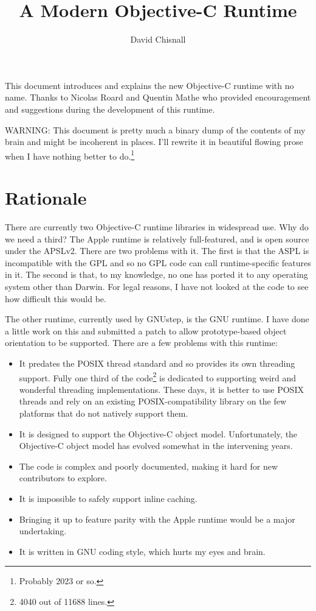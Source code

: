 \documentclass[10pt]{article}
\title{A Modern Objective-C Runtime}
\author{David Chisnall}
\begin{document}
	\maketitle

	This document introduces and explains the new Objective-C runtime with no name.  Thanks to Nicolas Roard and Quentin Mathe who provided encouragement and suggestions during the development of this runtime.
	
	WARNING: This document is pretty much a binary dump of the contents of my brain and might be incoherent in places.  I'll rewrite it in beautiful flowing prose when I have nothing better to do.\footnote{Probably 2023 or so.}

	\section{Rationale}

		There are currently two Objective-C runtime libraries in widespread use.  Why do we need a third?  The Apple runtime is relatively full-featured, and is open source under the APSLv2.  There are two problems with it.  The first is that the ASPL is incompatible with the GPL and so no GPL code can call runtime-specific features in it.  The second is that, to my knowledge, no one has ported it to any operating system other than Darwin.  For legal reasons, I have not looked at the code to see how difficult this would be.

		The other runtime, currently used by GNUstep, is the GNU runtime.  I have done a little work on this and submitted a patch to allow prototype-based object orientation to be supported.  There are a few problems with this runtime:

		\begin{itemize}
			\item It predates the POSIX thread standard and so provides its own threading support.  Fully one third of the code\footnote{4040 out of 11688 lines.} is dedicated to supporting weird and wonderful threading implementations.  These days, it is better to use POSIX threads and rely on an existing POSIX-compatibility library on the few platforms that do not natively support them.
			\item It is designed to support the Objective-C object model.  Unfortunately, the Objective-C object model has evolved somewhat in the intervening years.
			\item The code is complex and poorly documented, making it hard for new contributors to explore.
			\item It is impossible to safely support inline caching.
			\item Bringing it up to feature parity with the Apple runtime would be a major undertaking.
			\item It is written in GNU coding style, which hurts my eyes and brain.
		\end{itemize}
\end{document}
